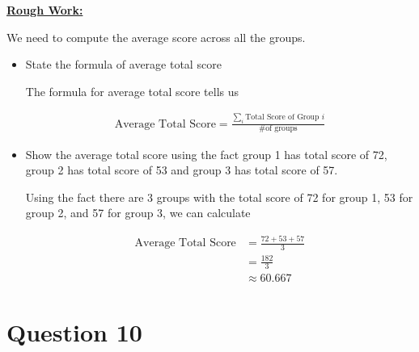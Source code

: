 \documentclass[12pt]{article}
\begin{document}
\begin{mdframed}
    \underline{\textbf{Rough Work:}}

    \bigskip

    We need to compute the average score across all the groups.

    \bigskip

    \begin{itemize}
        \item State the formula of average total score
        \begin{mdframed}
            The formula for average total score tells us

            \begin{align}
                \text{Average Total Score} = \frac{\sum\limits_{i} \text{Total Score of Group } i}{\text{\# of groups}}
            \end{align}
        \end{mdframed}

        \item Show the average total score using the fact group 1 has total score of 72,
        group 2 has total score of 53 and group 3 has total score of 57.

        \begin{mdframed}
            Using the fact there are 3 groups with the total score of 72 for group 1,
            53 for group 2, and 57 for group 3, we can calculate

            \begin{align}
                \text{Average Total Score} &= \frac{72 + 53 + 57}{3}\\
                &= \frac{182}{3}\\
                &\approx 60.667
            \end{align}
        \end{mdframed}
    \end{itemize}

\end{mdframed}


\section*{Question 10}
\end{document}
